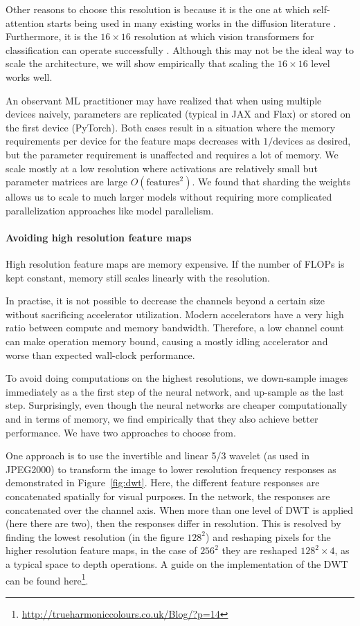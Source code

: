 Other reasons to choose this resolution is because it is the one at which self-attention starts being used in many existing works in the diffusion literature \citep{ho2020denoising,nichol2021improvedddpm}. Furthermore, it is the $16 \times 16$ resolution at which vision transformers for classification can operate successfully \citep{dosovitskiy2021imageisworth}. Although this may not be the ideal way to scale the architecture, we will show empirically that scaling the $16 \times 16$ level works well.

An observant ML practitioner may have realized that when using multiple devices naively, parameters are replicated (typical in JAX and Flax) or stored on the first device (PyTorch). Both cases result in a situation where the memory requirements per device for the feature maps decreases with $1 / \text{devices}$ as desired, but the parameter requirement is unaffected and requires a lot of memory. We scale mostly at a low resolution where activations are relatively small but parameter matrices are large $O(\text{features}^2)$. We found that sharding the weights allows us to scale to much larger models without requiring more complicated parallelization approaches like model parallelism.

\paragraph{Avoiding high resolution feature maps}
High resolution feature maps are memory expensive. If the number of FLOPs is kept constant, memory still scales linearly with the resolution.

In practise, it is not possible to decrease the channels beyond a certain size without sacrificing accelerator utilization. Modern accelerators have a very high ratio between compute and memory bandwidth. Therefore, a low channel count can make operation memory bound, causing a mostly idling accelerator and worse than expected wall-clock performance.

To avoid doing computations on the highest resolutions, we down-sample images immediately as a the first step of the neural network, and up-sample as the last step. Surprisingly, even though the neural networks are cheaper computationally and in terms of memory, we find empirically that they also achieve better performance. We have two approaches to choose from.

One approach is to use the invertible and linear 5/3 wavelet (as used in JPEG2000) to transform the image to lower resolution frequency responses as demonstrated in Figure~\ref{fig:dwt}. Here, the different feature responses are concatenated spatially for visual purposes. In the network, the responses are concatenated over the channel axis. When more than one level of DWT is applied (here there are two), then the responses differ in resolution. This is resolved by finding the lowest resolution (in the figure $128^2$) and reshaping pixels for the higher resolution feature maps, in the case of $256^2$ they are reshaped $128^2 \times 4$, as a typical space to depth operations. A guide on the implementation of the DWT can be found here\footnote{\url{http://trueharmoniccolours.co.uk/Blog/?p=14}}.

